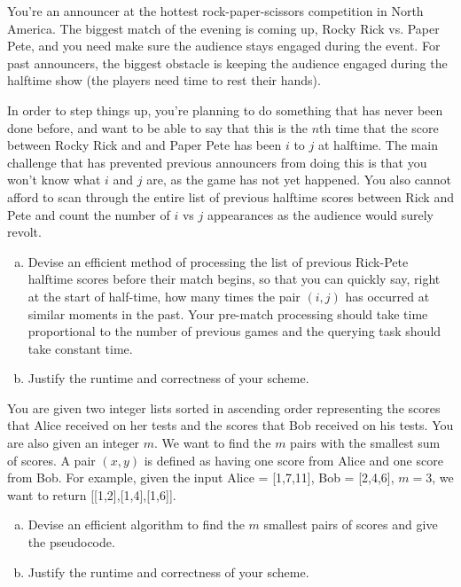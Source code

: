 \documentclass{common/cs157}
\begin{document}
\homeworkhandin %



\begin{problem}{1}
You're an announcer at the hottest rock-paper-scissors competition in North America. The biggest match of the evening is coming up, Rocky Rick vs. Paper Pete, and you need make sure the audience stays engaged during the event. For past announcers, the biggest obstacle is keeping the audience engaged during the halftime show (the players need time to rest their hands). 

In order to step things up, you're planning to do something that has never been done before, and want to be able to say that this is the $n$th time that the score between Rocky Rick and and Paper Pete has been $i$ to $j$ at halftime. The main challenge that has prevented previous announcers from doing this is that you won't know what $i$ and $j$ are, as the game has not yet happened. You also cannot afford to scan through the entire list of previous halftime scores between Rick and Pete and count the number of $i$ vs $j$ appearances as the audience would surely revolt.

\begin{enumerate}[a.]
    \item Devise an efficient method of processing the list of previous Rick-Pete halftime scores before their match begins, so that you can quickly say, right at the start of half-time, how many times the pair $(i, j)$ has occurred at similar moments in the past. Your pre-match processing should take time proportional to the number of previous games and the querying task should take constant time. 
    \item Justify the runtime and correctness of your scheme.
\end{enumerate}
\end{problem}

\begin{problem}{2}
You are given two integer lists sorted in ascending order representing the scores that Alice received on her tests and the scores that Bob received on his tests. You are also given an integer $m$. We want to find the $m$ pairs with the smallest sum of scores. A pair $(x,y)$ is defined as having one score from Alice and one score from Bob. For example, given the input Alice = [1,7,11], Bob = [2,4,6], $m = 3$, we want to return [[1,2],[1,4],[1,6]].

\begin{enumerate}[a.]
    \item Devise an efficient algorithm to find the $m$ smallest pairs of scores and give the pseudocode. 
    \item Justify the runtime and correctness of your scheme.
\end{enumerate}
\end{problem}


\newpage
\end{document}
